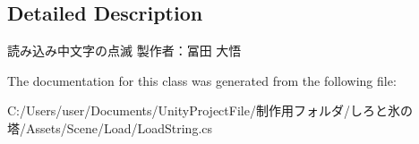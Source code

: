 \subsection{Detailed Description}
読み込み中文字の点滅 製作者：冨田 大悟 



The documentation for this class was generated from the following file\+:\begin{DoxyCompactItemize}
\item 
C\+:/\+Users/user/\+Documents/\+Unity\+Project\+File/制作用フォルダ/しろと氷の塔/\+Assets/\+Scene/\+Load/Load\+String.\+cs\end{DoxyCompactItemize}
